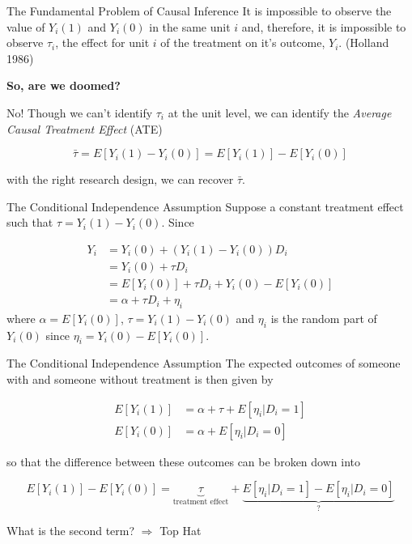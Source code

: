 \documentclass[
  ignorenonframetext,
]{beamer}
\begin{document}
\begin{frame}{The Fundamental Problem of Causal Inference}
\protect\hypertarget{the-fundamental-problem-of-causal-inference-1}{}
It is impossible to observe the value of \(Y_i(1)\) and \(Y_i(0)\) in
the same unit \(i\) and, therefore, it is impossible to observe
\(\tau_i\), the effect for unit \(i\) of the treatment on it's outcome,
\(Y_i\). (Holland 1986)

\centering

\textbf{So, are we doomed?}

\raggedright

No! Though we can't identify \(\tau_i\) at the unit level, we can
identify the \emph{Average Causal Treatment Effect} (ATE)

\[
\bar{\tau}=E[Y_i(1)-Y_i(0)]=E[Y_i(1)]-E[Y_i(0)]
\]

with the right research design, we can recover \(\bar{\tau}\).
\end{frame}

\begin{frame}{The Conditional Independence Assumption}
\protect\hypertarget{the-conditional-independence-assumption}{}
Suppose a constant treatment effect such that \(\tau=Y_i(1)-Y_i(0)\).
Since

\[
\begin{aligned}
Y_i&=Y_i(0)+(Y_i(1)-Y_i(0))D_i\\
&=Y_i(0)+\tau D_i\\
&=E[Y_i(0)]+\tau D_i+Y_i(0)-E[Y_i(0)]\\
&=\alpha+\tau D_i+\eta_i
\end{aligned}
\] where \(\alpha=E[Y_i(0)]\), \(\tau=Y_i(1)-Y_i(0)\) and \(\eta_i\) is
the random part of \(Y_i(0)\) since \(\eta_i=Y_i(0)-E[Y_i(0)]\).
\end{frame}

\begin{frame}{The Conditional Independence Assumption}
\protect\hypertarget{the-conditional-independence-assumption-1}{}
The expected outcomes of someone with and someone without treatment is
then given by

\[
\begin{aligned}
E[Y_i(1)]&=\alpha+\tau+E[\eta_i|D_i=1]\\
E[Y_i(0)]&=\alpha+E[\eta_i|D_i=0]
\end{aligned}
\]

so that the difference between these outcomes can be broken down into

\[
 E[Y_i(1)]-E[Y_i(0)] = 
    \underbrace{\tau}_\text{treatment effect} + \underbrace{E[\eta_i|D_i=1]-E[\eta_i|D_i=0]}_\text{?}
\]

What is the second term? \(\Rightarrow\) Top Hat
\end{frame}
\end{document}
